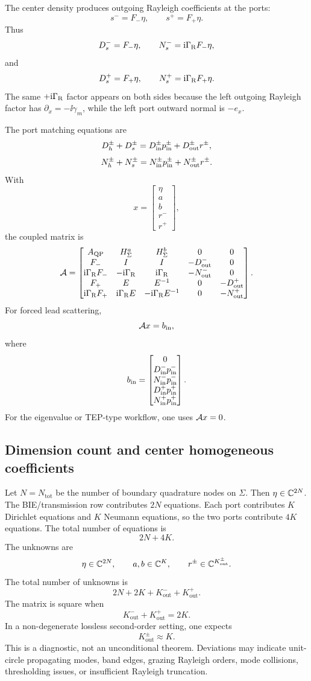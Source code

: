 The center density produces outgoing Rayleigh coefficients at the ports:
\[
  s^- = F_-\eta,
  \qquad
  s^+ = F_+\eta .
\]
Thus
\[
  D_s^- = F_-\eta,
  \qquad
  N_s^- = \mathrm{i}\Gamma_{\mathrm R} F_-\eta,
\]
and
\[
  D_s^+ = F_+\eta,
  \qquad
  N_s^+ = \mathrm{i}\Gamma_{\mathrm R} F_+\eta .
\]
The same \(+\mathrm{i}\Gamma_{\mathrm R}\) factor appears on both sides because the left outgoing
Rayleigh factor has \(\partial_x=-\ii\gamma_m\), while the left port outward
normal is \(-e_x\).

The port matching equations are
\[
  D_h^\pm+D_s^\pm
  =
  D_{\mathrm{in}}^\pm p_{\mathrm{in}}^\pm+D_{\mathrm{out}}^\pm r^\pm,
\]
\[
  N_h^\pm+N_s^\pm
  =
  N_{\mathrm{in}}^\pm p_{\mathrm{in}}^\pm+N_{\mathrm{out}}^\pm r^\pm .
\]
With
\[
  x=
  \begin{bmatrix}
  \eta\\
  a\\
  b\\
  r^-\\
  r^+
  \end{bmatrix},
\]
the coupled matrix is
\[
  \mathcal A
  =
  \begin{bmatrix}
  A_{\mathrm{QP}} & H_\Sigma^a & H_\Sigma^b & 0 & 0\\
  F_- & I & I & -D_{\mathrm{out}}^- & 0\\
  \mathrm{i}\Gamma_{\mathrm R} F_- & -\mathrm{i}\Gamma_{\mathrm R} & \mathrm{i}\Gamma_{\mathrm R} & -N_{\mathrm{out}}^- & 0\\
  F_+ & E & E^{-1} & 0 & -D_{\mathrm{out}}^+\\
  \mathrm{i}\Gamma_{\mathrm R} F_+ & \mathrm{i}\Gamma_{\mathrm R} E & -\mathrm{i}\Gamma_{\mathrm R} E^{-1} & 0 & -N_{\mathrm{out}}^+
  \end{bmatrix}.
\]
For forced lead scattering,
\[
  \mathcal A x=b_{\mathrm{in}},
\]
where
\[
  b_{\mathrm{in}}
  =
  \begin{bmatrix}
  0\\
  D_{\mathrm{in}}^-p_{\mathrm{in}}^-\\
  N_{\mathrm{in}}^-p_{\mathrm{in}}^-\\
  D_{\mathrm{in}}^+p_{\mathrm{in}}^+\\
  N_{\mathrm{in}}^+p_{\mathrm{in}}^+
  \end{bmatrix}.
\]
For the eigenvalue or TEP-type workflow, one uses \(\mathcal A x=0\).

\subsection{Dimension count and center homogeneous coefficients}

Let \(N=N_{\mathrm{tot}}\) be the number of boundary quadrature nodes on
\(\Sigma\).  Then \(\eta\in\mathbb C^{2N}\).  The BIE/transmission row contributes
\(2N\) equations.  Each port contributes \(K\) Dirichlet equations and \(K\)
Neumann equations, so the two ports contribute \(4K\) equations.  The total
number of equations is
\[
  2N+4K .
\]
The unknowns are
\[
  \eta\in\mathbb C^{2N},
  \qquad
  a,b\in\mathbb C^K,
  \qquad
  r^\pm\in\mathbb C^{K_{\mathrm{out}}^\pm}.
\]
The total number of unknowns is
\[
  2N+2K+K_{\mathrm{out}}^-+K_{\mathrm{out}}^+ .
\]
The matrix is square when
\[
  K_{\mathrm{out}}^-+K_{\mathrm{out}}^+=2K .
\]
In a non-degenerate lossless second-order setting, one expects
\[
  K_{\mathrm{out}}^\pm\approx K .
\]
This is a diagnostic, not an unconditional theorem.  Deviations may indicate
unit-circle propagating modes, band edges, grazing Rayleigh orders, mode
collisions, thresholding issues, or insufficient Rayleigh truncation.

